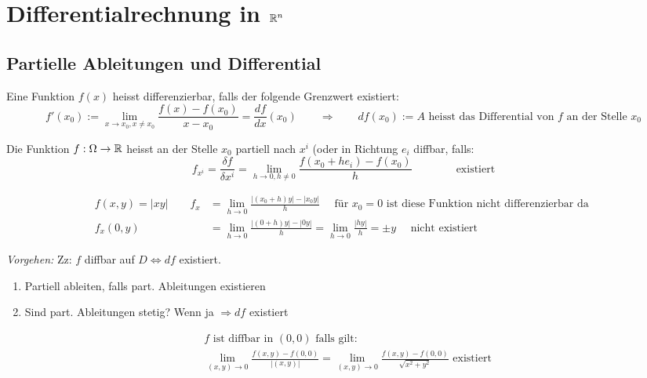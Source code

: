 \documentclass[a4paper]{article}
\begin{document}
\section{Differentialrechnung in $\mathbb{R}^n$}
	
	\subsection{Partielle Ableitungen und Differential}
	
		\begin{fdef}
			Eine Funktion $f(x)$ heisst differenzierbar, falls der folgende Grenzwert existiert:
				$$f'(x_0) := \lim_{x \rightarrow x_0, x \neq x_0} \frac{f(x) - f(x_0)}{x-x_0} = \frac{df}{dx}(x_0) \qquad \Rightarrow \qquad df(x_0) := A \text{ heisst das Differential von $f$ an der Stelle $x_0$}$$		
		\end{fdef}
		
		\begin{fdef}
			Die Funktion $f: \Omega \rightarrow \mathbb{R}$ heisst an der Stelle $x_0$ partiell nach $x^i$ (oder in Richtung $e_i$ diffbar, falls:
			$$f_{x^i} = \frac{\delta f}{\delta x^i} = \lim_{h \rightarrow 0, h \neq 0} 
			\frac{f(x_0+he_i) -f(x_0)}{h} \qquad \qquad \text{existiert}$$
		\end{fdef}
		\vspace{-8mm}
		\begin{align*}
			f(x,y) = |xy| \qquad f_x &= \lim_{h \rightarrow 0} \frac{|(x_0+h)y|-|x_0y|}{h} \quad \text{ für $x_0=0$ ist diese Funktion nicht differenzierbar da }\\
			f_x(0,y) &= \lim_{h \rightarrow 0} \frac{|(0+h)y|-|0y|}{h} = \lim_{h \rightarrow 0} \frac{|hy|}{h}=\pm y \quad \text{ nicht existiert}
		\end{align*}

		\begin{fdef}
			\emph{Vorgehen:} Zz: $f$ diffbar auf $D \Leftrightarrow df$ existiert.
			\begin{multicols}{2}
			\begin{enumerate} 
			 \item Partiell ableiten, falls part. Ableitungen existieren
			 \item Sind part. Ableitungen stetig? Wenn ja $\Rightarrow df$ existiert
			\end{enumerate}
			\begin{align*}			
				&\text{$f$ ist diffbar in $(0,0)$ falls gilt: }\\
				&\lim_{(x,y) \rightarrow 0} \frac{f(x,y) - f(0,0)}{|(x,y)|}= \lim_{(x,y) \rightarrow 0} \frac{f(x,y)-f(0,0)}{\sqrt{x^2+y^2}} \text{ existiert}
			\end{align*}

			\end{multicols}


		\end{fdef}
\end{document}
